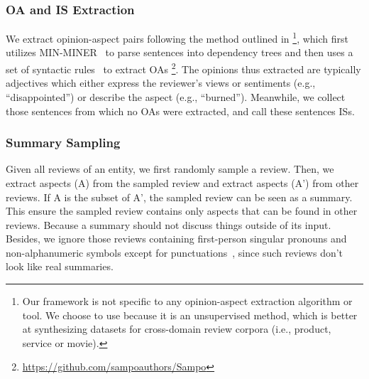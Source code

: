 \subsubsection{OA and IS Extraction} 
We extract opinion-aspect pairs following the method outlined in \cite{sampo}
\footnote{Our framework is not specific to any opinion-aspect extraction algorithm or tool.
We choose to use \cite{sampo} because it is an unsupervised method, 
which is better at synthesizing datasets for cross-domain review corpora 
(i.e., product, service or movie).}, 
which first utilizes MIN-MINER~\cite{basicOpiMin20} to 
parse sentences into dependency trees and then uses a set of 
syntactic rules~\cite{aspect12} to extract OAs
\footnote{\url{https://github.com/sampoauthors/Sampo}}. 
The opinions thus extracted are typically adjectives which either express the reviewer's
views or sentiments (e.g., ``disappointed'') or describe the aspect (e.g., ``burned'').
Meanwhile, we collect those sentences from which no OAs were extracted, and call these sentences ISs. 

\subsubsection{Summary Sampling} 
Given all reviews of an entity, 
we first randomly sample a review. 
Then, we extract aspects (A) from the sampled review and extract aspects (A’) from other reviews. 
If A is the subset of A’, the sampled review can be seen as a summary.
This ensure the sampled review contains only aspects that can be found in other reviews.
Because a summary should not discuss things outside of its input.
Besides, we ignore those reviews containing first-person singular pronouns
and non-alphanumeric symbols except for punctuations~\cite{Denoise20},
since such reviews don't look like real summaries.


